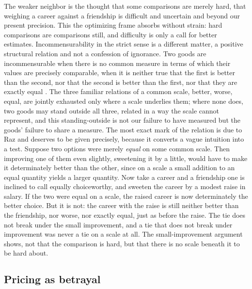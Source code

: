 The weaker neighbor is the thought that some comparisons are merely hard, that weighing a career against a friendship is difficult and uncertain and beyond our present precision. This the optimizing frame absorbs without strain: hard comparisons are comparisons still, and difficulty is only a call for better estimates. Incommensurability in the strict sense is a different matter, a positive structural relation and not a confession of ignorance. Two goods are incommensurable when there is no common measure in terms of which their values are precisely comparable, when it is neither true that the first is better than the second, nor that the second is better than the first, nor that they are exactly equal \parencite{raz1986morality,chang1997incommensurability}. The three familiar relations of a common scale, better, worse, equal, are jointly exhausted only where a scale underlies them; where none does, two goods may stand outside all three, related in a way the scale cannot represent, and this standing-outside is not our failure to have measured but the goods' failure to share a measure. The most exact mark of the relation is due to Raz and deserves to be given precisely, because it converts a vague intuition into a test. Suppose two options were merely \emph{equal} on some common scale. Then improving one of them even slightly, sweetening it by a little, would have to make it determinately better than the other, since on a scale a small addition to an equal quantity yields a larger quantity. Now take a career and a friendship one is inclined to call equally choiceworthy, and sweeten the career by a modest raise in salary. If the two were equal on a scale, the raised career is now determinately the better choice. But it is not: the career with the raise is still neither better than the friendship, nor worse, nor exactly equal, just as before the raise. The tie does not break under the small improvement, and a tie that does not break under improvement was never a tie on a scale at all. The small-improvement argument shows, not that the comparison is hard, but that there is no scale beneath it to be hard about.

\subsection*{Pricing as betrayal}


